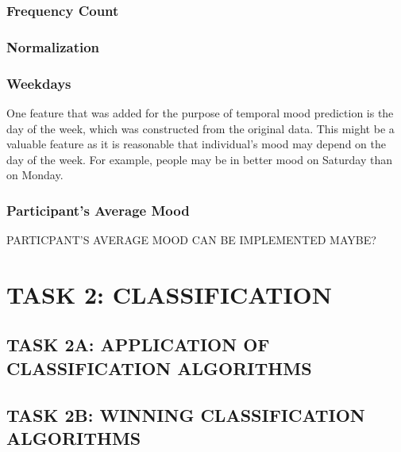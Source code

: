 \documentclass[runningheads]{llncs}
\begin{document}
\subsubsection{Frequency Count}

\subsubsection{Normalization}

\subsubsection{Weekdays}
One feature that was added for the purpose of temporal mood prediction is the day of the week, which was constructed from the original data. This might be a valuable feature as it is reasonable that individual's mood may depend on the day of the week. For example, people may be in better mood on Saturday than on Monday.
\subsubsection{Participant's Average Mood}
PARTICPANT'S AVERAGE MOOD CAN BE IMPLEMENTED MAYBE?

\section{TASK 2: CLASSIFICATION }
\subsection{TASK 2A: APPLICATION OF CLASSIFICATION ALGORITHMS}

\subsection{TASK 2B: WINNING CLASSIFICATION ALGORITHMS}









\end{document}
